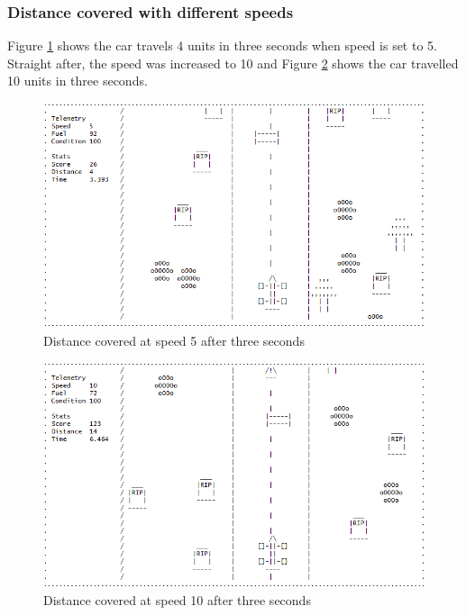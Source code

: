\documentclass{article}
\begin{document}
\subsubsection*{Distance covered with different speeds}
Figure \ref{fig:speed_midspeed} shows the car travels 4 units in three seconds when speed is set to 5. Straight after, the speed was increased to 10 and Figure  \ref{fig:speed_maxspeed} shows the car travelled 10 units in three seconds.
\begin{figure}[!ht]
	\begin{center}
	\includegraphics[width=0.667\paperwidth]{images/speed_midspeed}
	\caption{Distance covered at speed 5 after three seconds}
	\label{fig:speed_midspeed} 
	\end{center}
\end{figure}
\begin{figure}[!ht]
	\begin{center}
	\includegraphics[width=0.667\paperwidth]{images/speed_maxspeed}
	\caption{Distance covered at speed 10 after three seconds}
	\label{fig:speed_maxspeed} 
	\end{center}
\end{figure}
\newpage
\end{document}
